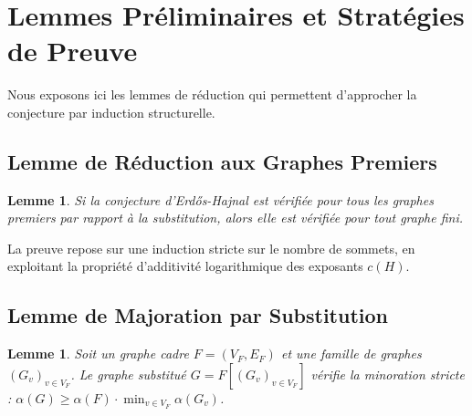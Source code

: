 \documentclass[11pt, a4paper]{article}
\newtheorem{lemma}[theorem]{Lemme}
\begin{document}
\section{Lemmes Préliminaires et Stratégies de Preuve}

Nous exposons ici les lemmes de réduction qui permettent d'approcher la conjecture par induction structurelle.

\subsection{Lemme de Réduction aux Graphes Premiers}

\begin{lemma}
Si la conjecture d'Erdős-Hajnal est vérifiée pour tous les graphes premiers par rapport à la substitution, alors elle est vérifiée pour tout graphe fini.
\end{lemma}
La preuve repose sur une induction stricte sur le nombre de sommets, en exploitant la propriété d'additivité logarithmique des exposants $c(H)$.

\subsection{Lemme de Majoration par Substitution}

\begin{lemma}
Soit un graphe cadre $F = (V_F, E_F)$ et une famille de graphes $(G_v)_{v \in V_F}$. Le graphe substitué $G = F[(G_v)_{v \in V_F}]$ vérifie la minoration stricte : $\alpha(G) \ge \alpha(F) \cdot \min_{v \in V_F} \alpha(G_v)$.
\end{lemma}
\end{document}
